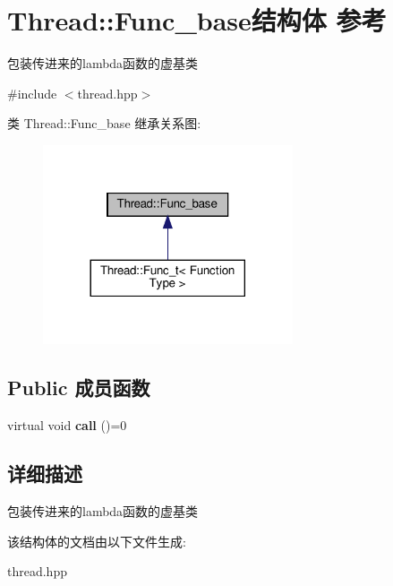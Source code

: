\hypertarget{structThread_1_1Func__base}{}\section{Thread\+:\+:Func\+\_\+base结构体 参考}
\label{structThread_1_1Func__base}


包装传进来的lambda函数的虚基类  




{\ttfamily \#include $<$thread.\+hpp$>$}



类 Thread\+:\+:Func\+\_\+base 继承关系图\+:\nopagebreak
\begin{figure}[H]
\begin{center}
\leavevmode
\includegraphics[width=209pt]{structThread_1_1Func__base__inherit__graph}
\end{center}
\end{figure}
\subsection*{Public 成员函数}
\begin{DoxyCompactItemize}
\item 
\mbox{\label{structThread_1_1Func__base_a53caa79f4dd5f1b90690a14e7c1e0437}} 
virtual void {\bfseries call} ()=0
\end{DoxyCompactItemize}


\subsection{详细描述}
包装传进来的lambda函数的虚基类 

该结构体的文档由以下文件生成\+:\begin{DoxyCompactItemize}
\item 
thread.\+hpp\end{DoxyCompactItemize}
